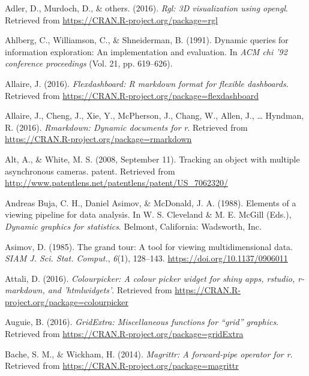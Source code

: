 \documentclass[12pt,]{isuthesis}
\begin{document}

\hypertarget{ref-rgl}{}
Adler, D., Murdoch, D., \& others. (2016). \emph{Rgl: 3D visualization
using opengl}. Retrieved from
\url{https://CRAN.R-project.org/package=rgl}

\hypertarget{ref-Ahlberg:1991}{}
Ahlberg, C., Williamson, C., \& Shneiderman, B. (1991). Dynamic queries
for information exploration: An implementation and evaluation. In
\emph{ACM chi '92 conference proceedings} (Vol. 21, pp. 619--626).

\hypertarget{ref-flexdashboard}{}
Allaire, J. (2016). \emph{Flexdashboard: R markdown format for flexible
dashboards}. Retrieved from
\url{https://CRAN.R-project.org/package=flexdashboard}

\hypertarget{ref-rmarkdown}{}
Allaire, J., Cheng, J., Xie, Y., McPherson, J., Chang, W., Allen, J.,
\ldots{} Hyndman, R. (2016). \emph{Rmarkdown: Dynamic documents for r}.
Retrieved from \url{https://CRAN.R-project.org/package=rmarkdown}

\hypertarget{ref-patent}{}
Alt, A., \& White, M. S. (2008, September 11). Tracking an object with
multiple asynchronous cameras. patent. Retrieved from
\url{http://www.patentlens.net/patentlens/patent/US_7062320/}

\hypertarget{ref-viewing-pipeline}{}
Andreas Buja, C. H., Daniel Asimov, \& McDonald, J. A. (1988). Elements
of a viewing pipeline for data analysis. In W. S. Cleveland \& M. E.
McGill (Eds.), \emph{Dynamic graphics for statistics}. Belmont,
California: Wadsworth, Inc.

\hypertarget{ref-grand-tour}{}
Asimov, D. (1985). The grand tour: A tool for viewing multidimensional
data. \emph{SIAM J. Sci. Stat. Comput.}, \emph{6}(1), 128--143.
\url{https://doi.org/10.1137/0906011}

\hypertarget{ref-colourpicker}{}
Attali, D. (2016). \emph{Colourpicker: A colour picker widget for shiny
apps, rstudio, r-markdown, and 'htmlwidgets'}. Retrieved from
\url{https://CRAN.R-project.org/package=colourpicker}

\hypertarget{ref-gridExtra}{}
Auguie, B. (2016). \emph{GridExtra: Miscellaneous functions for ``grid'' graphics}. Retrieved from \url{https://CRAN.R-project.org/package=gridExtra}

\hypertarget{ref-magrittr}{}
Bache, S. M., \& Wickham, H. (2014). \emph{Magrittr: A forward-pipe operator for r}. Retrieved from \url{https://CRAN.R-project.org/package=magrittr}
\end{document}
